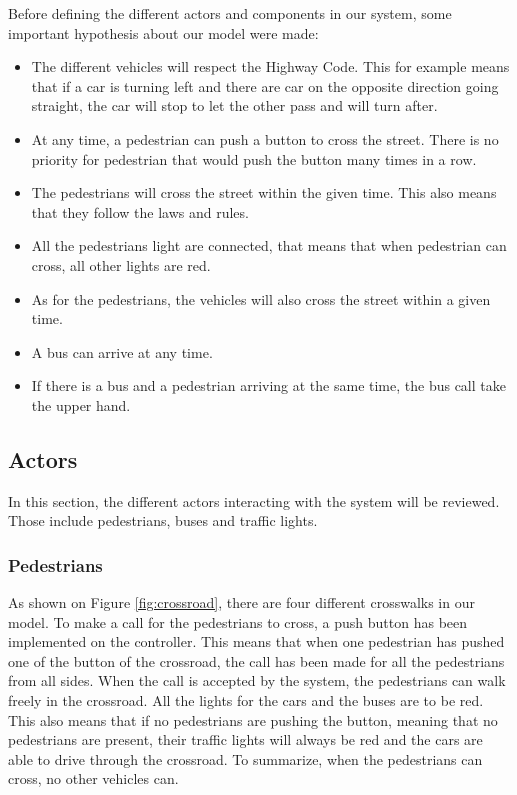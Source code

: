 Before defining the different actors and components in our system, some important hypothesis about our model were made:
\begin{itemize}
    \item The different vehicles will respect the Highway Code. This for example means that if a car is turning left and there are car on the opposite direction going straight, the car will stop to let the other pass and will turn after.
    \item At any time, a pedestrian can push a button to cross the street. There is no priority for pedestrian that would push the button many times in a row.
    \item The pedestrians will cross the street within the given time. This also means that they follow the laws and rules.
    \item All the pedestrians light are connected, that means that when pedestrian can cross, all other lights are red.
    \item As for the pedestrians, the vehicles will also cross the street within a given time.
    \item A bus can arrive at any time.
    \item If there is a bus and a pedestrian arriving at the same time, the bus call take the upper hand.
\end{itemize}

\subsection{Actors}
In this section, the different actors interacting with the system will be reviewed. Those include pedestrians, buses and traffic lights.

\subsubsection{Pedestrians}
As shown on Figure \ref{fig:crossroad}, there are four different crosswalks in our model. To make a call for the pedestrians to cross, a push button has been implemented on the controller. This means that when one pedestrian has pushed one of the button of the crossroad, the call has been made for all the pedestrians from all  sides. When the call is accepted by the system, the pedestrians can walk freely in the crossroad. All the lights for the cars and the buses are to be red. This also means that if no pedestrians are pushing the button, meaning that no pedestrians are present, their traffic lights will always be red and the cars are able to drive through the crossroad.
To summarize, when the pedestrians can cross, no other vehicles can. 

